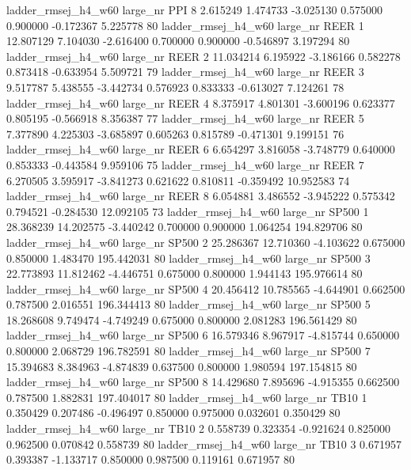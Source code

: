 ladder_rmsej_h4_w60   large_nr      PPI                 8  2.615249  1.474733  -3.025130 0.575000 0.900000 -0.172367    5.225778 80
ladder_rmsej_h4_w60   large_nr     REER                 1 12.807129  7.104030  -2.616400 0.700000 0.900000 -0.546897    3.197294 80
ladder_rmsej_h4_w60   large_nr     REER                 2 11.034214  6.195922  -3.186166 0.582278 0.873418 -0.633954    5.509721 79
ladder_rmsej_h4_w60   large_nr     REER                 3  9.517787  5.438555  -3.442734 0.576923 0.833333 -0.613027    7.124261 78
ladder_rmsej_h4_w60   large_nr     REER                 4  8.375917  4.801301  -3.600196 0.623377 0.805195 -0.566918    8.356387 77
ladder_rmsej_h4_w60   large_nr     REER                 5  7.377890  4.225303  -3.685897 0.605263 0.815789 -0.471301    9.199151 76
ladder_rmsej_h4_w60   large_nr     REER                 6  6.654297  3.816058  -3.748779 0.640000 0.853333 -0.443584    9.959106 75
ladder_rmsej_h4_w60   large_nr     REER                 7  6.270505  3.595917  -3.841273 0.621622 0.810811 -0.359492   10.952583 74
ladder_rmsej_h4_w60   large_nr     REER                 8  6.054881  3.486552  -3.945222 0.575342 0.794521 -0.284530   12.092105 73
ladder_rmsej_h4_w60   large_nr    SP500                 1 28.368239 14.202575  -3.440242 0.700000 0.900000  1.064254  194.829706 80
ladder_rmsej_h4_w60   large_nr    SP500                 2 25.286367 12.710360  -4.103622 0.675000 0.850000  1.483470  195.442031 80
ladder_rmsej_h4_w60   large_nr    SP500                 3 22.773893 11.812462  -4.446751 0.675000 0.800000  1.944143  195.976614 80
ladder_rmsej_h4_w60   large_nr    SP500                 4 20.456412 10.785565  -4.644901 0.662500 0.787500  2.016551  196.344413 80
ladder_rmsej_h4_w60   large_nr    SP500                 5 18.268608  9.749474  -4.749249 0.675000 0.800000  2.081283  196.561429 80
ladder_rmsej_h4_w60   large_nr    SP500                 6 16.579346  8.967917  -4.815744 0.650000 0.800000  2.068729  196.782591 80
ladder_rmsej_h4_w60   large_nr    SP500                 7 15.394683  8.384963  -4.874839 0.637500 0.800000  1.980594  197.154815 80
ladder_rmsej_h4_w60   large_nr    SP500                 8 14.429680  7.895696  -4.915355 0.662500 0.787500  1.882831  197.404017 80
ladder_rmsej_h4_w60   large_nr     TB10                 1  0.350429  0.207486  -0.496497 0.850000 0.975000  0.032601    0.350429 80
ladder_rmsej_h4_w60   large_nr     TB10                 2  0.558739  0.323354  -0.921624 0.825000 0.962500  0.070842    0.558739 80
ladder_rmsej_h4_w60   large_nr     TB10                 3  0.671957  0.393387  -1.133717 0.850000 0.987500  0.119161    0.671957 80
